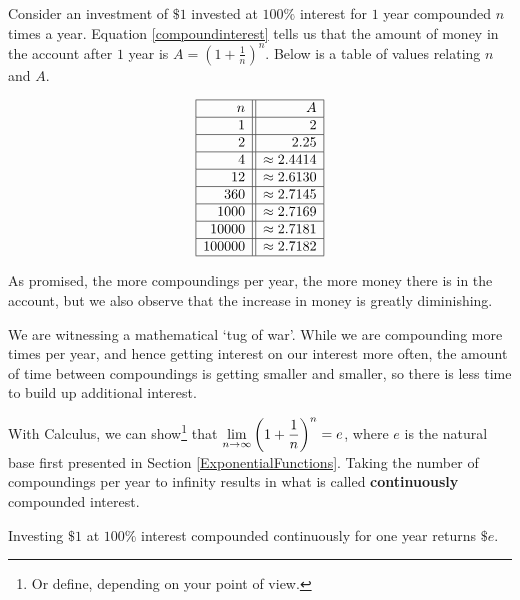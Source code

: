 \documentclass{ximera}
\begin{document}
Consider an investment of $\$ 1$ invested at $100 \%$ interest for $1$ year compounded $n$ times a year.  Equation \ref{compoundinterest} tells us that the amount of money in the account after $1$ year is $A = \left(1+\frac{1}{n}\right)^{n}$.  Below is a table of values relating $n$ and $A$.

\[ \begin{array}{|r||r|}  

\hline

 n & A   \\ \hline
1  & 2  \\  \hline
2  & 2.25  \\  \hline
4 & \approx 2.4414  \\  \hline
12 & \approx 2.6130  \\  \hline
360  & \approx  2.7145 \\  \hline
1000  & \approx 2.7169 \\  \hline
10000  & \approx 2.7181  \\  \hline
100000 & \approx 2.7182  \\  \hline
\end{array} \]

As promised, the more compoundings per year, the more money there is in the account, but we also observe that the increase in money is greatly diminishing.  

\smallskip

We are witnessing a mathematical `tug of war'.  While we are compounding more times per year, and hence getting interest on our interest more often, the amount of time between compoundings is getting smaller and smaller, so there is less time to build up additional interest. 

\smallskip

With Calculus, we can show\footnote{Or define, depending on your point of view.} that $\ds{\lim_{n \rightarrow \infty} \left(1+\frac{1}{n}\right)^{n} = e}$, where $e$ is the natural base first presented in Section \ref{ExponentialFunctions}.  Taking the number of compoundings per year to infinity results in what is called  \textbf{continuously} compounded interest.  

\smallskip

\colorbox{ResultColor}{\bbm

\begin{theorem} \label{whatise} Investing $\$1$ at $100 \%$ interest compounded continuously for one year returns $\$ e$. 

\end{theorem}

\ebm}
\end{document}
